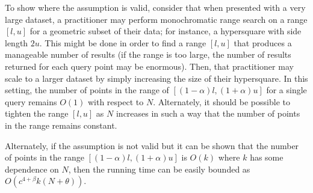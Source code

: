 To show where the assumption is valid, consider that when presented with a very
large dataset, a practitioner may perform monochromatic range search on a range
$[l, u]$ for a geometric subset of their data; for instance, a hypersquare
with side length $2u$.  This might be done in order to find a range $[l, u]$
that produces a manageable number of results (if the range is too large, the
number of results returned for each query point may be enormous).  Then, that
practitioner may scale to a larger dataset by simply increasing the size of
their hypersquare.  In this setting, the number of points in the range of
$[(1 - \alpha)l, (1 + \alpha)u]$ for a single query remains $O(1)$ with respect
to $N$.  Alternately, it should be possible to tighten the range $[l, u]$ as $N$
increases in such a way that the number of points in the range remains constant.


Alternately, if the assumption is not valid but it can be shown that the number
of points in the range $[(1 - \alpha)l, (1 + \alpha)u]$ is $O(k)$ where $k$ has
some dependence on $N$, then the running time can be easily bounded as $O(c^{4 +
\beta} k(N + \theta))$.

